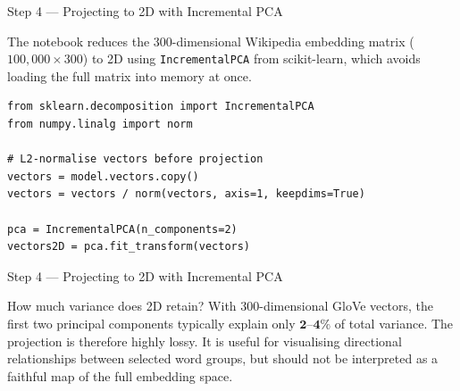 \documentclass[11pt,aspectratio=169,professionalfonts]{beamer}
\begin{document}
\begin{frame}[fragile]{Step 4 — Projecting to 2D with Incremental PCA}

The notebook reduces the 300-dimensional Wikipedia embedding matrix
($100{,}000 \times 300$) to 2D using \texttt{IncrementalPCA} from scikit-learn,
which avoids loading the full matrix into memory at once.

\begin{lstlisting}
from sklearn.decomposition import IncrementalPCA
from numpy.linalg import norm

# L2-normalise vectors before projection
vectors = model.vectors.copy()
vectors = vectors / norm(vectors, axis=1, keepdims=True)

pca = IncrementalPCA(n_components=2)
vectors2D = pca.fit_transform(vectors)
\end{lstlisting}
\end{frame}
%
%
\begin{frame}[fragile]{Step 4 — Projecting to 2D with Incremental PCA}
\begin{alertblock}{How much variance does 2D retain?}
  With 300-dimensional GloVe vectors, the first two principal components
  typically explain only $\mathbf{2}$--$\mathbf{4\%}$ of total variance.
  The projection is therefore highly lossy. It is useful for visualising
  directional relationships between selected word groups, but should not
  be interpreted as a faithful map of the full embedding space.
\end{alertblock}

\end{frame}
%
%
\end{document}
